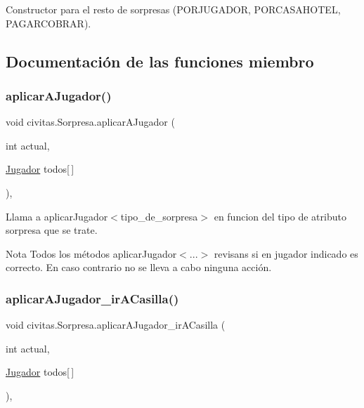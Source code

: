 Constructor para el resto de sorpresas (P\+O\+R\+J\+U\+G\+A\+D\+OR, P\+O\+R\+C\+A\+S\+A\+H\+O\+T\+EL, P\+A\+G\+A\+R\+C\+O\+B\+R\+AR). 

\subsection{Documentación de las funciones miembro}
\mbox{\label{classcivitas_1_1Sorpresa_a368a76d34d0b1e3eb55519876ebcba44}} 
\subsubsection{\texorpdfstring{aplicar\+A\+Jugador()}{aplicarAJugador()}}
{\footnotesize\ttfamily void civitas.\+Sorpresa.\+aplicar\+A\+Jugador (\begin{DoxyParamCaption}\item[{int}]{actual,  }\item[{\hyperlink{classcivitas_1_1Jugador}{Jugador}}]{todos\mbox{[}$\,$\mbox{]} }\end{DoxyParamCaption})\hspace{0.3cm}{\ttfamily [inline]}, {\ttfamily [package]}}

Llama a aplicar\+Jugador$<$tipo\+\_\+de\+\_\+sorpresa$>$ en funcion del tipo de atributo sorpresa que se trate. \begin{DoxyNote}{Nota}
Todos los métodos aplicar\+Jugador$<$...$>$ revisans si en jugador indicado es correcto. En caso contrario no se lleva a cabo ninguna acción. 
\end{DoxyNote}
\mbox{\label{classcivitas_1_1Sorpresa_a4ff8261c67fb8ee584c6519fb2780354}} 
\subsubsection{\texorpdfstring{aplicar\+A\+Jugador\+\_\+ir\+A\+Casilla()}{aplicarAJugador\_irACasilla()}}
{\footnotesize\ttfamily void civitas.\+Sorpresa.\+aplicar\+A\+Jugador\+\_\+ir\+A\+Casilla (\begin{DoxyParamCaption}\item[{int}]{actual,  }\item[{\hyperlink{classcivitas_1_1Jugador}{Jugador}}]{todos\mbox{[}$\,$\mbox{]} }\end{DoxyParamCaption})\hspace{0.3cm}{\ttfamily [inline]}, {\ttfamily [private]}}

